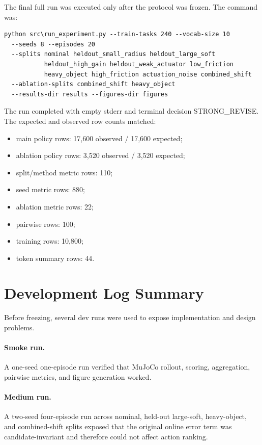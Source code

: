 \documentclass{article}
\begin{document}
The final full run was executed only after the protocol was frozen. The command was:

\begin{verbatim}
python src\run_experiment.py --train-tasks 240 --vocab-size 10
  --seeds 8 --episodes 20
  --splits nominal heldout_small_radius heldout_large_soft
           heldout_high_gain heldout_weak_actuator low_friction
           heavy_object high_friction actuation_noise combined_shift
  --ablation-splits combined_shift heavy_object
  --results-dir results --figures-dir figures
\end{verbatim}

The run completed with empty stderr and terminal decision STRONG\_REVISE. The expected and observed row counts matched:

\begin{itemize}
\item main policy rows: 17,600 observed / 17,600 expected;
\item ablation policy rows: 3,520 observed / 3,520 expected;
\item split/method metric rows: 110;
\item seed metric rows: 880;
\item ablation metric rows: 22;
\item pairwise rows: 100;
\item training rows: 10,800;
\item token summary rows: 44.
\end{itemize}

\section{Development Log Summary}

Before freezing, several dev runs were used to expose implementation and design problems.

\paragraph{Smoke run.}
A one-seed one-episode run verified that MuJoCo rollout, scoring, aggregation, pairwise metrics, and figure generation worked.

\paragraph{Medium run.}
A two-seed four-episode run across nominal, held-out large-soft, heavy-object, and combined-shift splits exposed that the original online error term was candidate-invariant and therefore could not affect action ranking.
\end{document}
